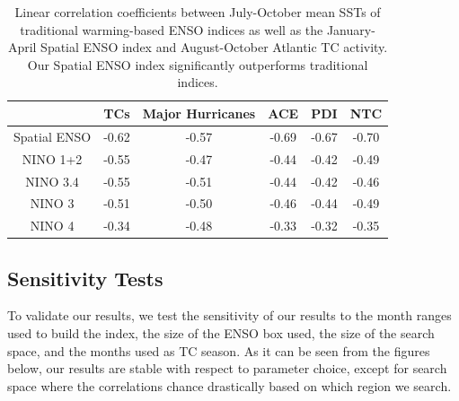 \documentclass[]{article}
\begin{document}
\begin{table}
\begin{center}
\begin{tabular}{cccccc}
\hline
&TCs & Major Hurricanes & ACE & PDI & NTC\\
\hline
Spatial ENSO & -0.62 & -0.57 & -0.69 & -0.67 & -0.70\\
NINO 1+2 & -0.55 & -0.47 & -0.44 & -0.42 & -0.49\\
NINO 3.4 & -0.55 & -0.51 & -0.44 & -0.42 & -0.46\\
NINO 3 & -0.51 & -0.50 & -0.46 & -0.44 & -0.49\\
NINO 4 & -0.34 & -0.48 & -0.33 & -0.32 & -0.35\\
\hline
\end{tabular}
\end{center}
\caption{Linear correlation coefficients between July-October mean SSTs of traditional warming-based ENSO indices as well as the January-April Spatial ENSO index and August-October Atlantic TC activity. Our Spatial ENSO index significantly outperforms traditional indices.}
\label{ref:table_jul_oct}
\end{table}

\subsection{Sensitivity Tests}
To validate our results, we test the sensitivity of our results to the month ranges used to build the index, the size of the ENSO box used, the size of the search space, and the months used as TC season. As it can be seen from the figures below, our results are stable with respect to parameter choice, except for search space where the correlations chance drastically based on which region we search.



\end{document}

